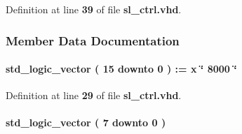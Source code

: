 Definition at line {\bf 39} of file {\bf sl\+\_\+ctrl.\+vhd}.



\subsubsection{Member Data Documentation}
\paragraph[{data\+\_\+const}]{ {\bfseries \textcolor{comment}{std\+\_\+logic\+\_\+vector}\textcolor{vhdlchar}{ }\textcolor{vhdlchar}{(}\textcolor{vhdlchar}{ }\textcolor{vhdlchar}{ } \textcolor{vhdldigit}{15} \textcolor{vhdlchar}{ }\textcolor{keywordflow}{downto}\textcolor{vhdlchar}{ }\textcolor{vhdlchar}{ } \textcolor{vhdldigit}{0} \textcolor{vhdlchar}{ }\textcolor{vhdlchar}{)}\textcolor{vhdlchar}{ }\textcolor{vhdlchar}{ }\textcolor{vhdlchar}{ }\textcolor{vhdlchar}{\+:}\textcolor{vhdlchar}{=}\textcolor{vhdlchar}{ }\textcolor{vhdlchar}{ }\textcolor{vhdlchar}{x}\textcolor{vhdlchar}{ }\textcolor{keyword}{\char`\"{} 8000 \char`\"{}}\textcolor{vhdlchar}{ }} \hspace{0.3cm}{\ttfamily [Constant]}}\label{classsl__ctrl_1_1arch_abf5e14fcf02cf9baed54fd55e2f99d09}


Definition at line {\bf 29} of file {\bf sl\+\_\+ctrl.\+vhd}.

\paragraph[{delay\+\_\+n}]{ {\bfseries \textcolor{comment}{std\+\_\+logic\+\_\+vector}\textcolor{vhdlchar}{ }\textcolor{vhdlchar}{(}\textcolor{vhdlchar}{ }\textcolor{vhdlchar}{ } \textcolor{vhdldigit}{7} \textcolor{vhdlchar}{ }\textcolor{keywordflow}{downto}\textcolor{vhdlchar}{ }\textcolor{vhdlchar}{ } \textcolor{vhdldigit}{0} \textcolor{vhdlchar}{ }\textcolor{vhdlchar}{)}\textcolor{vhdlchar}{ }} \hspace{0.3cm}{\ttfamily [Signal]}}\label{classsl__ctrl_1_1arch_a5f69ed812500205dc0d5e0bb4c916c87}


